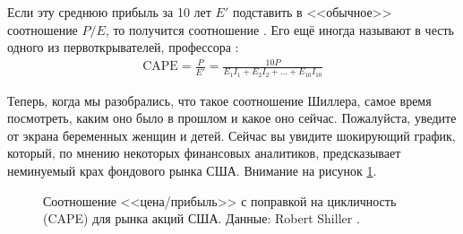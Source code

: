 Если эту среднюю прибыль за 10 лет $E'$ подставить в <<обычное>> соотношение $P/E$, то получится соотношение . Его ещё иногда называют  в честь одного из первоткрывателей, профессора  \cite{campbell1988dividend}:
\begin{align}
\text{CAPE} = \frac{P}{E'} = \frac{10P}{E_1I_1 + E_2I_2 + ... + E_{10}I_{10}}
\label{cape_formula}
\end{align}

Теперь, когда мы разобрались, что такое соотношение Шиллера, самое время посмотреть, каким оно было в прошлом и какое оно сейчас. Пожалуйста, уведите от экрана беременных женщин и детей. Сейчас вы увидите шокирующий график, который, по мнению некоторых  финансовых аналитиков, предсказывает неминуемый крах фондового рынка США. Внимание на рисунок \ref{shiller_pe_historical_chart}.



\newcommand{\dotWithNumber}[5] {
        \node[
            circle,
            fill,
            inner sep = 2pt,
            color = #3
        ]
        at (axis cs: #1, #2) {};
        
        \node[
            anchor=#5
        ]
        at (axis cs: #1, #2)
        {#4};
}



\begin{figure}[ht]
\centering
{}
\caption{Соотношение <<цена/прибыль>> с поправкой на цикличность (CAPE) для рынка акций США. Данные: Robert Shiller \cite{shillerOnline}.}
\label{shiller_pe_historical_chart}
\end{figure}

